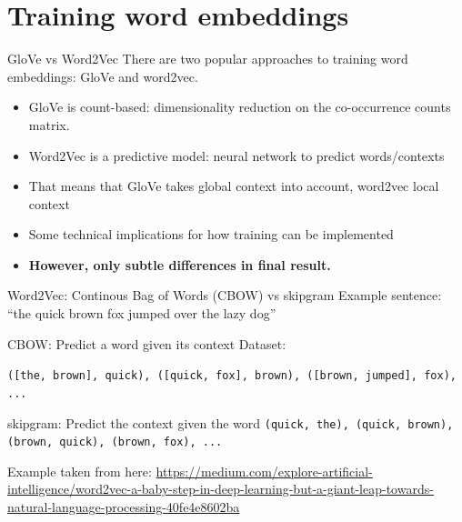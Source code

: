 \documentclass[compress]{beamer}
\begin{document}
\section{Training word embeddings}


\begin{frame}{GloVe vs Word2Vec}
	There are two popular approaches to training word embeddings: GloVe and word2vec.
	\begin{itemize}
		\item GloVe is count-based: dimensionality reduction on the co-occurrence counts matrix.
		\item Word2Vec is a predictive model: neural network to predict words/contexts
		\item That means that GloVe takes global context into account, word2vec local context
		\item Some technical implications for how training can be implemented 
		\item \textbf{However, only subtle differences in final result.}
	\end{itemize}
	
\end{frame}



\begin{frame}{Word2Vec: Continous Bag of Words (CBOW) vs skipgram}
	Example sentence: ``the quick brown fox jumped over the lazy dog''
	\begin{block}{CBOW: Predict a word given its context}
		Dataset:
		
		\texttt{([the, brown], quick), ([quick, fox], brown), ([brown, jumped], fox), ...}
	\end{block}
	
	\pause
	
	
	\begin{block}{skipgram: Predict the context given the word}	
		\texttt{(quick, the), (quick, brown), (brown, quick), (brown, fox), ...}
	\end{block}
	
	\tiny{Example taken from here: \url{https://medium.com/explore-artificial-intelligence/word2vec-a-baby-step-in-deep-learning-but-a-giant-leap-towards-natural-language-processing-40fe4e8602ba}}
\end{frame}

\end{document}

